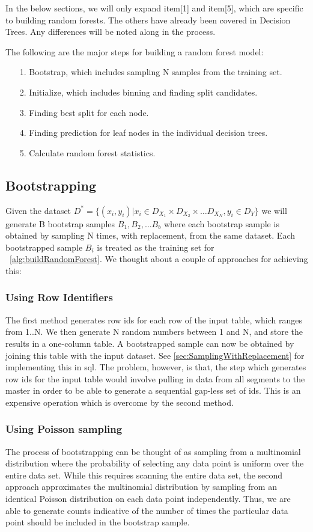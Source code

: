 In the below sections, we will only expand item[1] and item[5], which are specific
to building random forests. The others have already been covered in Decision Trees.
Any differences will be noted along in the process.

The following are the major steps for building a random forest model:
\begin{itemize}
\item[1.] Bootstrap, which includes sampling N samples from the training set.
\item[2.] Initialize, which includes binning and finding split candidates.
\item[3.] Finding best split for each node.
\item[4.] Finding prediction for leaf nodes in the individual decision trees.
\item[5.] Calculate random forest statistics.
\end{itemize}

\subsection{Bootstrapping}
Given the dataset $D^* = \{(x_i, y_i) | x_i \in D_{X_1} \times D_{X_2} \times \dots D_{X_N}, y_i \in D_Y\}$
we will generate B bootstrap samples $B_{1}, B_{2}, \dots B_{b}$ where each bootstrap
sample is obtained by sampling N times, with replacement, from the same dataset.
Each bootstrapped sample $B_{i}$ is treated as the training set for ~\ref{alg:buildRandomForest}.
We thought about a couple of approaches for achieving this:

\subsubsection{Using Row Identifiers}
The first method generates row ids for each row of the input table, which ranges from 
  1..N. We then generate N random numbers between 1 and N, and store the results in a 
  one-column table. A bootstrapped sample can now be obtained by joining this
  table with the input dataset. See \ref{sec:SamplingWithReplacement} for implementing this
  in sql. The problem, however, is that, the step which generates row ids for the input table 
  would involve pulling in data from all segments to the master in order to be able to generate 
  a sequential gap-less set of ids. This is an expensive operation which is overcome by the 
  second method.
  
\subsubsection{Using Poisson sampling}
The process of bootstrapping can be thought of as sampling from a multinomial 
  distribution where the probability of selecting any data point is uniform
  over the entire data set. While this requires scanning the entire data set, the second 
  approach approximates the multinomial distribution by sampling from an identical 
  Poisson distribution on each data point independently. Thus, we are able to generate
  counts indicative of the number of times the particular data point should 
  be included in the bootstrap sample.

